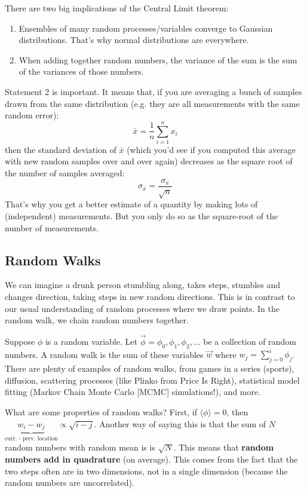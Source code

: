 \documentclass{article}
\begin{document}
There are two big implications of the Central Limit theorem:
\begin{enumerate}
\item Ensembles of many random processes/variables converge to Gaussian distributions.  That's why normal distributions are everywhere.
\item When adding together random numbers, the variance of the sum is the sum of the variances of those numbers.
\end{enumerate}
Statement 2 is important.  It means that, if you are averaging a bunch of samples drawn from the same distribution (e.g. they are all measurements with the same random error):
\begin{equation}
\bar x = \frac1n\sum_{i=1}^n{x_i}
\end{equation}
then the standard deviation of $\bar x$ (which you'd see if you computed this average with new random samples over and over again) decreases as the square root
of the number of samples averaged:
\begin{equation}
\sigma_{\bar x} = \frac{\sigma_x}{\sqrt{n}}
\end{equation}
That's why you get a better estimate of a quantity by making lots of (independent) measurements.  But you only do so as the square-root of the number of measurements.

\subsection{Random Walks}

We can imagine a drunk person stumbling along, takes steps, stumbles and changes direction, taking steps in new random directions. This is in contrast to our usual understanding of random processes where we draw points. In the random walk, we chain random numbers together.

Suppose $\phi$ is a random variable. Let $\vec{\phi} = \phi_0, \phi_1, \phi_2,...$ be a collection of random numbers. A random walk is the sum of these variables $\vec{w}$ where $w_j = \sum_{j=0}^{i} \phi_j$. There are plenty of examples of random walks, from games in a series (sports), diffusion, scattering processes (like Plinko from Price Is Right), statistical model fitting (Markov Chain Monte Carlo [MCMC] simulations!), and more. 

What are some properties of random walks? First, if $\langle \phi \rangle = 0$, then $\underbrace{w_i - w_j}_{\text{curr. - prev. location}} \propto \sqrt{i-j}$. Another way of saying this is that the sum of $N$ random numbers with random mean is is $\sqrt{N}$. This means that \textbf{random numbers add in quadrature} (on average). This comes from the fact that the two steps often are in two dimensions, not in a single dimension (because the random numbers are uncorrelated). 
\end{document}
